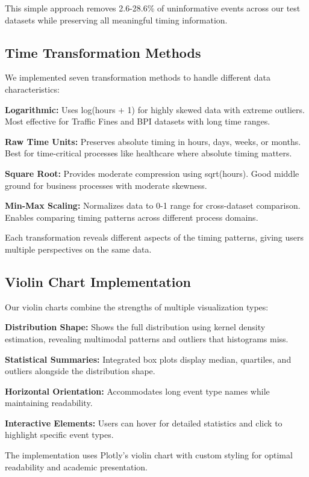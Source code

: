 This simple approach removes 2.6-28.6\% of uninformative events across our test datasets while preserving all meaningful timing information.

\subsection{Time Transformation Methods}
\label{subsec:transformations}

We implemented seven transformation methods to handle different data characteristics:

\textbf{Logarithmic:} Uses log(hours + 1) for highly skewed data with extreme outliers. Most effective for Traffic Fines and BPI datasets with long time ranges.

\textbf{Raw Time Units:} Preserves absolute timing in hours, days, weeks, or months. Best for time-critical processes like healthcare where absolute timing matters.

\textbf{Square Root:} Provides moderate compression using sqrt(hours). Good middle ground for business processes with moderate skewness.

\textbf{Min-Max Scaling:} Normalizes data to 0-1 range for cross-dataset comparison. Enables comparing timing patterns across different process domains.

Each transformation reveals different aspects of the timing patterns, giving users multiple perspectives on the same data.

\subsection{Violin Chart Implementation}
\label{subsec:violin_charts}

Our violin charts combine the strengths of multiple visualization types:

\textbf{Distribution Shape:} Shows the full distribution using kernel density estimation, revealing multimodal patterns and outliers that histograms miss.

\textbf{Statistical Summaries:} Integrated box plots display median, quartiles, and outliers alongside the distribution shape.

\textbf{Horizontal Orientation:} Accommodates long event type names while maintaining readability.

\textbf{Interactive Elements:} Users can hover for detailed statistics and click to highlight specific event types.

The implementation uses Plotly's violin chart with custom styling for optimal readability and academic presentation.

